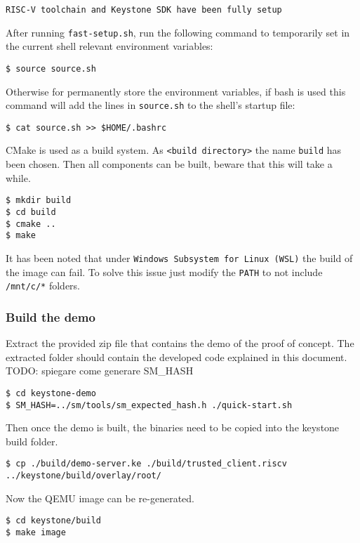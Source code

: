 \begin{lstlisting}[frame=single]
    RISC-V toolchain and Keystone SDK have been fully setup
\end{lstlisting}
After running \texttt{fast-setup.sh}, run the following command to temporarily set in the current shell relevant environment variables: 
\begin{lstlisting}[frame=single]
$ source source.sh
\end{lstlisting}
Otherwise for permanently store the environment variables, if bash is used this command will add the lines in \texttt{source.sh} to the shell's startup file: 
\begin{lstlisting}[frame=single]
$ cat source.sh >> $HOME/.bashrc
\end{lstlisting}
CMake \cite{cmake} is used as a build system. As \texttt{<build directory>} the name \texttt{build} has been chosen. Then all components can be built, beware that this will take a while. 
\begin{lstlisting}[frame=single]
$ mkdir build
$ cd build
$ cmake ..
$ make
\end{lstlisting}
\begin{mybox}
\faExclamation\enspace It has been noted that under \texttt{Windows Subsystem for Linux (WSL)} the build of the image can fail. To solve this issue just modify the \texttt{PATH} to not include \texttt{/mnt/c/*} folders.
\end{mybox}

\subsubsection{Build the demo}
Extract the provided zip file that contains the demo of the proof of concept. The extracted folder should contain the developed code explained in this document.
{\color{red}TODO: spiegare come generare SM\_HASH}
\begin{lstlisting}[frame=single]
$ cd keystone-demo
$ SM_HASH=../sm/tools/sm_expected_hash.h ./quick-start.sh
\end{lstlisting}
Then once the demo is built, the binaries need to be copied into the keystone build folder.

\begin{lstlisting}[frame=single]
$ cp ./build/demo-server.ke ./build/trusted_client.riscv ../keystone/build/overlay/root/
\end{lstlisting}
Now the QEMU image can be re-generated.

\begin{lstlisting}[frame=single]
$ cd keystone/build
$ make image
\end{lstlisting}

